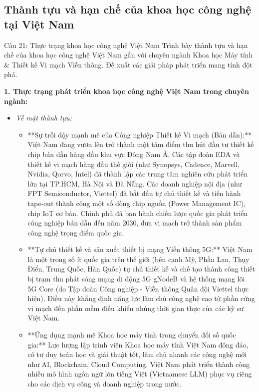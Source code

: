 \documentclass[12pt,a4paper]{article}
\begin{document}
{\subsection{Thành tựu và hạn chế của khoa học công nghệ tại Việt Nam}

\begin{questionbox}{Câu 21: Thực trạng khoa học công nghệ Việt Nam}
Trình bày thành tựu và hạn chế của khoa học công nghệ Việt Nam gắn với chuyên ngành Khoa học Máy tính \& Thiết kế Vi mạch Viễn thông. Đề xuất các giải pháp phát triển mang tính đột phá.
\end{questionbox}

\noindent
\textbf{1. Thực trạng phát triển khoa học công nghệ Việt Nam trong chuyên ngành:}

\begin{itemize}
    \item \textit{Về mặt thành tựu:}
    \begin{itemize}
        \item **Sự trỗi dậy mạnh mẽ của Công nghiệp Thiết kế Vi mạch (Bán dẫn):** Việt Nam đang vươn lên trở thành một tâm điểm thu hút đầu tư thiết kế chip bán dẫn hàng đầu khu vực Đông Nam Á. Các tập đoàn EDA và thiết kế vi mạch hàng đầu thế giới (như Synopsys, Cadence, Marvell, Nvidia, Qorvo, Intel) đã thành lập các trung tâm nghiên cứu phát triển lớn tại TP.HCM, Hà Nội và Đà Nẵng. Các doanh nghiệp nội địa (như FPT Semiconductor, Viettel) đã bắt đầu tự chủ thiết kế và tiến hành tape-out thành công một số dòng chip nguồn (Power Management IC), chip IoT cơ bản. Chính phủ đã ban hành chiến lược quốc gia phát triển công nghiệp bán dẫn đến năm 2030, đưa vi mạch trở thành sản phẩm công nghệ trọng điểm quốc gia.
        \item **Tự chủ thiết kế và sản xuất thiết bị mạng Viễn thông 5G:** Việt Nam là một trong số ít quốc gia trên thế giới (bên cạnh Mỹ, Phần Lan, Thụy Điển, Trung Quốc, Hàn Quốc) tự chủ thiết kế và chế tạo thành công thiết bị trạm thu phát sóng mạng di động 5G gNodeB và hệ thống mạng lõi 5G Core (do Tập đoàn Công nghiệp - Viễn thông Quân đội Viettel thực hiện). Điều này khẳng định năng lực làm chủ công nghệ cao từ phần cứng vi mạch đến phần mềm điều khiển nhúng thời gian thực của các kỹ sư Việt Nam.
        \item **Ứng dụng mạnh mẽ Khoa học máy tính trong chuyển đổi số quốc gia:** Lực lượng lập trình viên Khoa học máy tính Việt Nam đông đảo, có tư duy toán học và giải thuật tốt, làm chủ nhanh các công nghệ mới như AI, Blockchain, Cloud Computing. Việt Nam phát triển thành công nhiều mô hình ngôn ngữ lớn tiếng Việt (Vietnamese LLM) phục vụ riêng cho các dịch vụ công và doanh nghiệp trong nước.

\end{itemize}
\end{itemize}}
\end{document}

